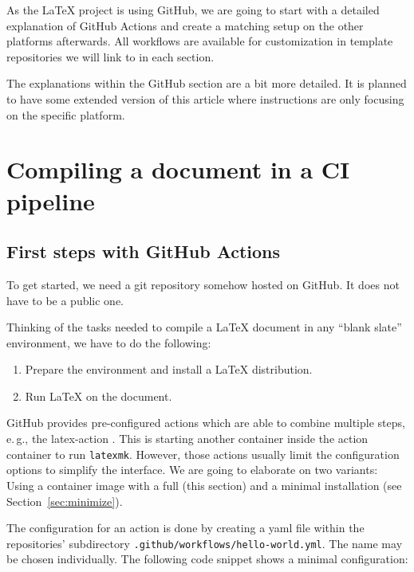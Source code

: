 \documentclass[final]{ltugboat}
\newcommand*{\setListingIcon}[1]{\def\listingIcon{#1}}
\newcommand*{\TeXLive}{\acro{\TeX\,Live}\xspace}
\newcommand*{\command}[1]{\texttt{#1}}
\newcommand*{\file}[1]{\texttt{#1}}
\begin{document}
As the \LaTeX{} project is using GitHub, we are going to start with a detailed explanation of GitHub Actions and create a matching setup on the other platforms afterwards.
All workflows are available for customization in template repositories we will link to in each section.

The explanations within the GitHub section are a bit more detailed.
It is planned to have some extended version of this article where instructions are only focusing on the specific platform.

\section{Compiling a document in a CI pipeline}

\subsection{First steps with GitHub Actions}
\setListingIcon{\GitHub}

To get started, we need a git repository somehow hosted on GitHub.
It does not have to be a public one.

Thinking of the tasks needed to compile a \LaTeX{} document in any “blank slate” environment, we have to do the following:

\begin{enumerate}
\item Prepare the environment and install a \LaTeX{} distribution.
\item Run \LaTeX{} on the document.
\end{enumerate}
%
\noindent GitHub provides pre-configured actions which are able to combine multiple steps, e.\,g., the latex-action \cite{latex-action}.
This  is starting another container inside the action container to run \command{latexmk}.
However, those actions usually limit the configuration options to simplify the interface.
We are going to elaborate on two variants: Using a container image with a full \TeXLive (this section) and a minimal installation (see Section~\ref{sec:minimize}).

The configuration for an action is done by creating a yaml file within the repositories' subdirectory \file{.github/workflows/hello-world.yml}.
The name may be chosen individually.
The following code snippet shows a minimal configuration:

\inputminted{yaml}{examples/hello-world.yml}
\end{document}
